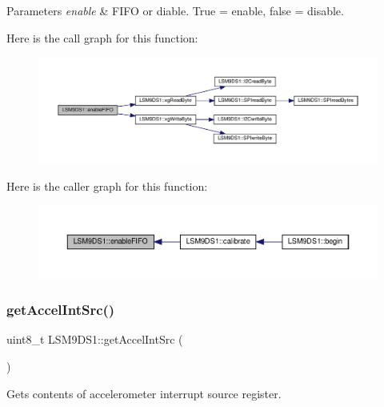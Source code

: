 \begin{DoxyParams}{Parameters}
{\em enable} & F\+I\+FO or diable. True = enable, false = disable. \\
\hline
\end{DoxyParams}
Here is the call graph for this function\+:
\nopagebreak
\begin{figure}[H]
\begin{center}
\leavevmode
\includegraphics[width=350pt]{classLSM9DS1_a5f01141131318697838f15d7e5d10f2c_cgraph}
\end{center}
\end{figure}
Here is the caller graph for this function\+:
\nopagebreak
\begin{figure}[H]
\begin{center}
\leavevmode
\includegraphics[width=350pt]{classLSM9DS1_a5f01141131318697838f15d7e5d10f2c_icgraph}
\end{center}
\end{figure}
\mbox{\label{classLSM9DS1_ae42ae3b368370f977d090ba0e53c7f5c}} 
\subsubsection{\texorpdfstring{get\+Accel\+Int\+Src()}{getAccelIntSrc()}}
{\footnotesize\ttfamily uint8\+\_\+t L\+S\+M9\+D\+S1\+::get\+Accel\+Int\+Src (\begin{DoxyParamCaption}{ }\end{DoxyParamCaption})}



Gets contents of accelerometer interrupt source register. 

